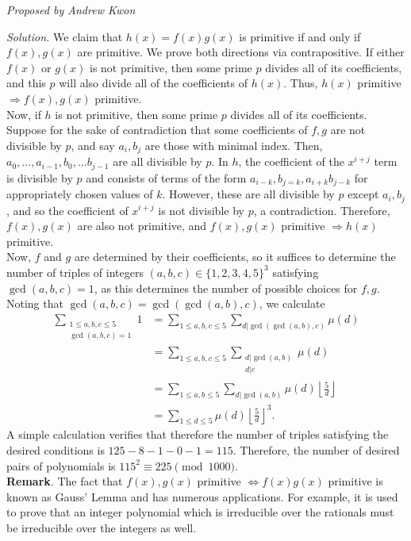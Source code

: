 \documentclass[10pt]{article}
\newcounter{enum}
\newcommand{\proposed}[1]
{
\vspace{5pt}
\noindent\textit{Proposed by #1}
}
\newcommand{\solution}
{
\vspace{5pt}
\noindent\textit{Solution.}\qquad
}
\begin{document}
\begin{enumerate}
		\proposed{Andrew Kwon}

		\solution We claim that $h(x) = f(x) g(x)$ is primitive if and only if $f(x),g(x)$ are primitive. We prove both directions via contrapositive. If either $f(x)$ or $g(x)$ is not primitive, then some prime $p$ divides all of its coefficients, and this $p$ will also divide all of the coefficients of $h(x)$. Thus, $h(x)$ primitive $\Rightarrow f(x), g(x)$ primitive.\\

		Now, if $h$ is not primitive, then some prime $p$ divides all of its coefficients. Suppose for the sake of contradiction that some coefficients of $f,g$ are not divisible by $p$, and say $a_{i}, b_{j}$ are those with minimal index. Then, $a_{0}, \ldots, a_{i-1}, b_{0}, \ldots b_{j-1}$ are all divisible by $p$. In $h$, the coefficient of the $x^{i+j}$ term is divisible by $p$ and consists of terms of the form $a_{i-k}, b_{j=k}, a_{i+k} b_{j-k}$ for appropriately chosen values of $k$. However, these are all divisible by $p$ except $a_{i}, b_{j}$, and so the coefficient of $x^{i+j}$ is not divisible by $p$, a contradiction. Therefore, $f(x),g(x)$ are also not primitive, and $f(x), g(x)$ primitive $\Rightarrow h(x)$ primitive.\\

		Now, $f$ and $g$ are determined by their coefficients, so it suffices to determine the number of triples of integers $(a,b,c) \in \{1, 2, 3, 4, 5\}^{3}$ satisfying $\gcd(a,b,c) = 1$, as this determines the number of possible choices for $f,g$. Noting that $\gcd(a,b,c) = \gcd(\gcd(a,b), c)$, we calculate
		\begin{align*}
			\sum_{\substack{1 \leq a,b,c \leq 5 \\ \gcd(a,b,c) = 1}}^{} 1 &= \sum_{1 \leq a,b,c \leq 5}^{} \sum_{d | \gcd( \gcd(a,b), c)}^{} \mu(d)\\
			&= \sum_{1 \leq a,b,c \leq 5}^{}  \sum_{\substack{d | \gcd(a,b) \\ d | c}}^{} \mu(d)\\
			&= \sum_{1 \leq a, b \leq 5}^{} \sum_{d | \gcd(a,b)}^{} \mu(d) \left\lfloor \tfrac{5}{d} \right\rfloor\\
			&= \sum_{1\leq  d \leq 5}^{} \mu(d) \left\lfloor \tfrac{5}{d} \right\rfloor^{3}.
		\end{align*}
		A simple calculation verifies that therefore the number of triples satisfying the desired conditions is $125 - 8 - 1 - 0 - 1 = 115$. Therefore, the number of desired pairs of polynomials is $115^{2} \equiv \boxed{225} \pmod{1000}$.\\

		\textbf{Remark}. The fact that $f(x),g(x)$ primitive $\Leftrightarrow f(x)g(x)$ primitive is known as Gauss' Lemma and has numerous applications. For example, it is used to prove that an integer polynomial which is irreducible over the rationals must be irreducible over the integers as well.
\end{enumerate}
\end{document}
